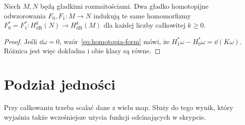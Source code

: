 \begin{wniosek}
\label{cor:de-rham-homotopia}
Niech $M,N$ będą gładkimi rozmaitościami.
Dwa gładko homotopijne odwzorowania $F_0,F_1:M\to N$
indukują te same homomorfizmy
$F_0^*=F_1^*:H^k_{\mathrm{dR}}(N)\to H^k_{\mathrm{dR}}(M)$
dla każdej liczby całkowitej $k\geq0$.
\end{wniosek}
\begin{proof}
Jeśli $\dd\omega=0$, wzór~\eqref{eq:homotopia-form}
mówi, że $H_1^*\omega-H_0^*\omega=\dd(K\omega)$.
Różnica jest więc dokładna i obie klasy są równe.
\end{proof}

\section{Podział jedności}
\label{sec:formy-podzial-jednosci}

Przy całkowaniu trzeba scalać dane z wielu map.
Służy do tego wynik, który wyjaśnia także wcześniejsze
użycia funkcji odcinających w skrypcie.


